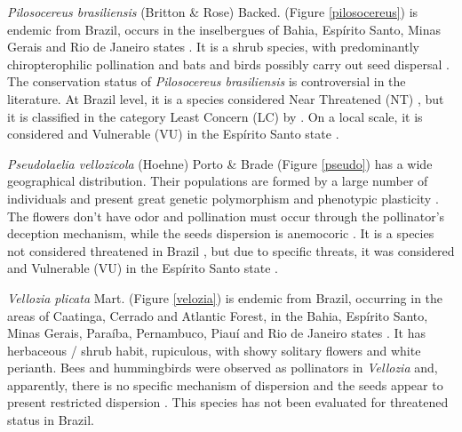 \textit{Pilosocereus brasiliensis} (Britton \& Rose) Backed. (Figure \ref{pilosocereus}) is endemic from Brazil, occurs in the inselbergues of Bahia, Espírito Santo, Minas Gerais and Rio de Janeiro states \citep{bgf2018BrazilianFlora2020}. It is a shrub species, with predominantly chiropterophilic pollination  \citep{lucena2007FenologiaBiologiaPolinizacao} and bats and birds possibly carry out seed dispersal \citep{taylor2004CactiEasternBrazil}. The conservation status of \textit{Pilosocereus brasiliensis} is controversial in the literature. At Brazil level, it is a species considered Near Threatened (NT) \citep{martinelli2013LivroVermelhoFlora}, but it is classified in the category Least Concern (LC) by \cite{zappi2011PlanoAcaoNacional}. On a local scale, it is considered and Vulnerable (VU) in the Espírito Santo state \citep{simonelli2007EspeciesFloraAmeacadas}.

\textit{Pseudolaelia vellozicola} (Hoehne) Porto \& Brade (Figure \ref{pseudo}) has a wide geographical distribution. Their populations are formed by a large number of individuals \citep{meninineto2011LectotypificationsPseudolaeliaLaeliinae,meninineto2012BiogeographyConservationStatus} and present great genetic polymorphism and phenotypic plasticity \citep{meninineto2012BiogeographyConservationStatus}. The flowers don't have odor and pollination must occur through the pollinator's deception mechanism, while the seeds dispersion is anemocoric \citep{meninineto2013TaxonomicRevisionPseudolaelia}. It is a species not considered threatened in Brazil \citep{martinelli2013LivroVermelhoFlora}, but due to specific threats, it was considered and Vulnerable (VU) in the Espírito Santo state \citep{simonelli2007EspeciesFloraAmeacadas}.

\textit{Vellozia plicata} Mart. (Figure \ref{velozia}) is endemic from Brazil, occurring in the areas of Caatinga, Cerrado and Atlantic Forest, in the Bahia, Espírito Santo, Minas Gerais, Paraíba, Pernambuco, Piauí and Rio de Janeiro states \citep{bgf2018BrazilianFlora2020}. It has herbaceous / shrub habit, rupiculous, with showy solitary flowers and white perianth. Bees and hummingbirds were observed as pollinators in \textit{Vellozia} and, apparently, there is no specific mechanism of dispersion and the seeds appear to present restricted dispersion \citep{franceschinelli2006GeneticDiversityTwo,jacobi2007PollinationTwoSpecies}. This species has not been evaluated for threatened status in Brazil.


